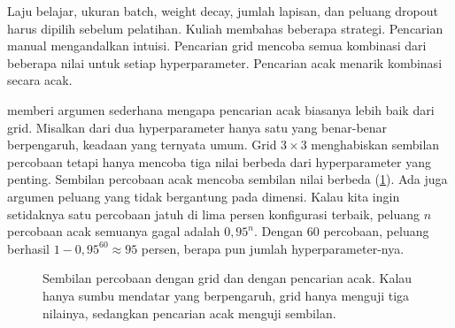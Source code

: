 Laju belajar, ukuran batch, weight decay, jumlah lapisan, dan peluang dropout harus dipilih sebelum pelatihan. Kuliah membahas
beberapa strategi. Pencarian manual mengandalkan intuisi. Pencarian grid mencoba semua kombinasi dari beberapa nilai untuk
setiap hyperparameter. Pencarian acak menarik kombinasi secara acak.

\citet{bergstra2012} memberi argumen sederhana mengapa pencarian acak biasanya lebih baik dari grid. Misalkan dari dua
hyperparameter hanya satu yang benar-benar berpengaruh, keadaan yang ternyata umum. Grid $3\times3$ menghabiskan sembilan
percobaan tetapi hanya mencoba tiga nilai berbeda dari hyperparameter yang penting. Sembilan percobaan acak mencoba sembilan
nilai berbeda (\cref{fig:gridrandom}). Ada juga argumen peluang yang tidak bergantung pada dimensi. Kalau kita ingin
setidaknya satu percobaan jatuh di lima persen konfigurasi terbaik, peluang $n$ percobaan acak semuanya gagal adalah
$0{,}95^n$. Dengan 60 percobaan, peluang berhasil $1-0{,}95^{60}\approx95$ persen, berapa pun jumlah hyperparameter-nya.

\begin{figure}[ht]
\centering
{}
\caption{Sembilan percobaan dengan grid dan dengan pencarian acak. Kalau hanya sumbu mendatar yang berpengaruh, grid hanya
menguji tiga nilainya, sedangkan pencarian acak menguji sembilan.}
\label{fig:gridrandom}
\end{figure}

